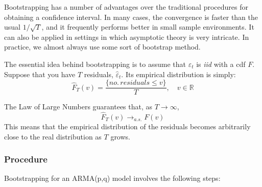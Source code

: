 \documentclass[11pt, a4paper]{report}
\theoremstyle{plain}
\theoremstyle{plain}
\theoremstyle{remark}
\begin{document}
Bootstrapping has a number of advantages over the traditional procedures for obtaining a confidence interval. In many cases, the convergence is faster than the usual $1/\sqrt{T}$, and it frequently performs better in small sample environments. It can also be applied in settings in which asymptotic theory is very intricate. In practice, we almost always use some sort of bootstrap method. 

The essential idea behind bootstrapping is to assume that $\varepsilon_{t}$ is \textit{iid} with a cdf $F$. Suppose that you have $T$ residuals, $\hat{\varepsilon}_t$. Its empirical distribution is simply: 
$$ \hat{F}_T(v) = \dfrac{\{ no. \, residuals \leq v \}}{T}, \hspace{1em} v \in \mathbb{R}$$

The Law of Large Numbers guarantees that, as $T \to \infty$, 
$$ \hat{F}_T(v) \to_{a.s.} F(v) $$
This means that the empirical distribution of the residuals becomes arbitrarily close to the real distribution as $T$ grows.

\subsubsection{Procedure}

Bootstrapping for an ARMA(p,q) model involves the following steps:
\end{document}
